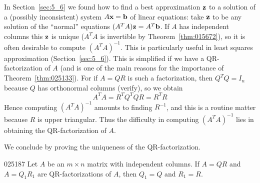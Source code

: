 \vspace{1em}

\noindent In Section~\ref{sec:5_6} we found how to find a best approximation $\textbf{z}$ to a solution of a (possibly inconsistent) system $A\textbf{x} = \textbf{b}$ of linear equations: take $\textbf{z}$ to be any solution of the ``normal'' equations $(A^{T}A)\textbf{z} = A^{T}\textbf{b}$. If $A$ has independent columns this $\textbf{z}$ is unique ($A^{T}A$ is invertible by Theorem~\ref{thm:015672}), so it is often desirable to compute $(A^{T}A)^{-1}$. This is particularly useful in least squares approximation (Section~\ref{sec:5_6}). This is simplified if we have a QR-factorization of $A$ (and is one of the main reasons for the importance of Theorem~\ref{thm:025133}). For if $A = QR$ is such a factorization, then $Q^{T}Q = I_{n}$ because $Q$ has orthonormal columns (verify), so we obtain
\begin{equation*}
A^TA = R^TQ^TQR = R^TR
\end{equation*}
Hence computing $(A^{T}A)^{-1}$ amounts to finding $R^{-1}$, and this is a routine matter because $R$ is upper triangular. Thus the difficulty in computing $(A^{T}A)^{-1}$ lies in obtaining the QR-factorization of $A$.

\bigskip

We conclude by proving the uniqueness of the QR-factorization.


\begin{theorem}{}{025187}
Let $A$ be an $m \times n$ matrix with independent columns. If $A = QR$ and $A = Q_{1}R_{1}$ are QR-factorizations of $A$, then $Q_{1} = Q$ and $R_{1} = R$.
\end{theorem}

